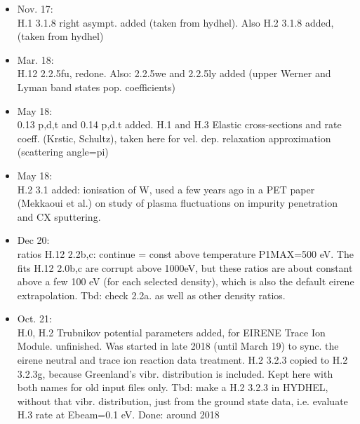 \documentclass[12pt,dvipdfmx]{article}
\begin{document}
\begin{itemize}
H.1  3.1.8ST  and 3.1.8ST2  left asympt. added. Was missing.
\item Nov. 17: \\
H.1  3.1.8 right asympt. added (taken from hydhel). Also H.2  3.1.8 added, (taken from hydhel)
\item Mar. 18: \\
H.12  2.2.5fu, redone. Also: 2.2.5we and 2.2.5ly added (upper Werner and Lyman band
states pop. coefficients)
\item May 18: \\
0.13 p,d,t and 0.14 p,d.t added. H.1 and H.3 Elastic cross-sections and rate coeff.
(Krstic, Schultz), taken here for vel. dep. relaxation approximation (scattering angle=pi)
\item May 18: \\
H.2  3.1 added: ionisation of W, used a few years ago in a PET paper (Mekkaoui et al.)
on study of plasma
fluctuations on impurity penetration and CX sputtering.
\item Dec 20: \\
ratios H.12  2.2b,c:  continue = const above temperature P1MAX=500 eV. The fits H.12 2.0b,c are corrupt above 1000eV,
but these ratios are about constant above a few 100 eV (for each selected density), which is also the default eirene extrapolation.
Tbd: check 2.2a.  as well as other density ratios.
\item Oct. 21: \\
H.0, H.2 Trubnikov potential parameters added, for EIRENE Trace Ion Module.
unfinished. Was started in late 2018  (until March 19)
to sync. the eirene neutral and trace ion reaction data treatment.
H.2 3.2.3 copied to H.2 3.2.3g, because Greenland's vibr. distribution is included.
Kept here with both names for old input files only.
Tbd: make a H.2 3.2.3 in HYDHEL, without that vibr. distribution,
just from the ground state data, i.e. evaluate H.3 rate at Ebeam=0.1 eV. Done: around 2018
\end{itemize}
\end{document}
